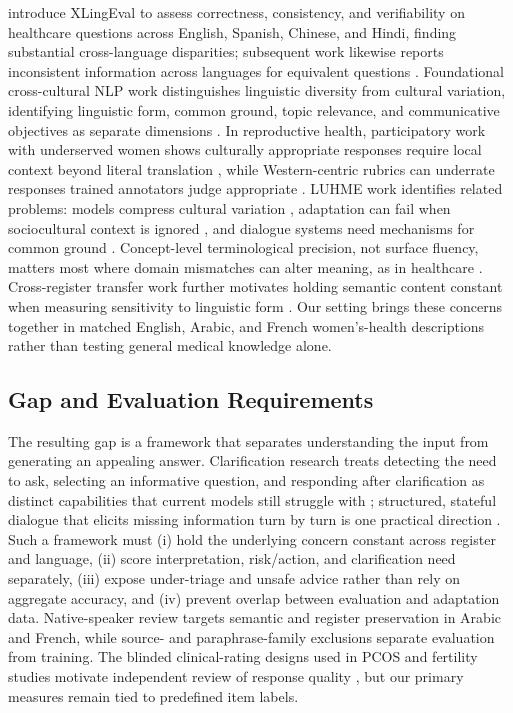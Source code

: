 \citet{jin-etal-2024-better} introduce XLingEval to assess correctness, consistency, and verifiability on healthcare questions across English, Spanish, Chinese, and Hindi, finding substantial cross-language disparities; subsequent work likewise reports inconsistent information across languages for equivalent questions \citep{schlicht-etal-2025-consistent}.
Foundational cross-cultural NLP work distinguishes linguistic diversity from cultural variation, identifying linguistic form, common ground, topic relevance, and communicative objectives as separate dimensions \citep{hershcovich-etal-2022-challenges,adilazuarda-etal-2024-towards}.
In reproductive health, participatory work with underserved women shows culturally appropriate responses require local context beyond literal translation \citep{deva-etal-2025-family}, while Western-centric rubrics can underrate responses trained annotators judge appropriate \citep{dey-etal-2025-beyond}.
LUHME work identifies related problems: models compress cultural variation \citep{mohammadi-etal-2025-large}, adaptation can fail when sociocultural context is ignored \citep{freitas-cardoso-2025-nightmare}, and dialogue systems need mechanisms for common ground \citep{anikina-etal-2025-building}.
Concept-level terminological precision, not surface fluency, matters most where domain mismatches can alter meaning, as in healthcare \citep{heinisch-2025-terminologists}.
Cross-register transfer work further motivates holding semantic content constant when measuring sensitivity to linguistic form \cite{nicholls-alperin-2025-cross}.
Our setting brings these concerns together in matched English, Arabic, and French women's-health descriptions rather than testing general medical knowledge alone.

\subsection{Gap and Evaluation Requirements}

The resulting gap is a framework that separates understanding the input from generating an appealing answer.
Clarification research treats detecting the need to ask, selecting an informative question, and responding after clarification as distinct capabilities that current models still struggle with \citep{testoni-fernandez-2024-asking,zhang-choi-2025-clarify}; structured, stateful dialogue that elicits missing information turn by turn is one practical direction \citep{demarco-etal-2024-converso}.
Such a framework must (i) hold the underlying concern constant across register and language, (ii) score interpretation, risk/action, and clarification need separately, (iii) expose under-triage and unsafe advice rather than rely on aggregate accuracy, and (iv) prevent overlap between evaluation and adaptation data.
Native-speaker review targets semantic and register preservation in Arabic and French, while source- and paraphrase-family exclusions separate evaluation from training.
The blinded clinical-rating designs used in PCOS and fertility studies motivate independent review of response quality \citep{graca-etal-2026-assessing,gely-etal-2026-large}, but our primary measures remain tied to predefined item labels.

